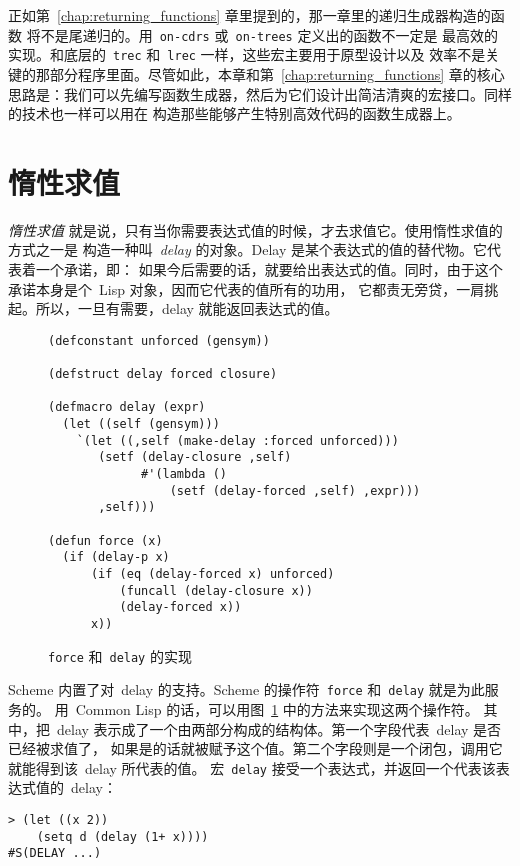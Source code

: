 正如第~\ref{chap:returning_functions} 章里提到的，那一章里的递归生成器构造的函数
将不是尾递归的。用~\texttt{on-cdrs} 或~\texttt{on-trees} 定义出的函数不一定是
最高效的实现。和底层的~\texttt{trec} 和~\texttt{lrec} 一样，这些宏主要用于原型设计以及
效率不是关键的那部分程序里面。尽管如此，本章和第~\ref{chap:returning_functions} 章的核心
思路是：我们可以先编写函数生成器，然后为它们设计出简洁清爽的宏接口。同样的技术也一样可以用在
构造那些能够产生特别高效代码的函数生成器上。

\section{惰性求值}
\label{sec:lazy_evaluation}

\emph{惰性求值} 就是说，只有当你需要表达式值的时候，才去求值它。使用惰性求值的方式之一是
构造一种叫~\emph{delay} 的对象。Delay 是某个表达式的值的替代物。它代表着一个承诺，即：
如果今后需要的话，就要给出表达式的值。同时，由于这个承诺本身是个~Lisp 对象，因而它代表的值所有的功用，
它都责无旁贷，一肩挑起。所以，一旦有需要，delay 就能返回表达式的值。

\begin{figure}
\begin{lstlisting}
(defconstant unforced (gensym))

(defstruct delay forced closure)

(defmacro delay (expr)
  (let ((self (gensym)))
    `(let ((,self (make-delay :forced unforced)))
       (setf (delay-closure ,self)
             #'(lambda ()
                 (setf (delay-forced ,self) ,expr)))
       ,self)))

(defun force (x)
  (if (delay-p x)
      (if (eq (delay-forced x) unforced)
          (funcall (delay-closure x))
          (delay-forced x))
      x))
\end{lstlisting}
  \caption{\texttt{force} 和~\texttt{delay} 的实现}
  \label{fig:implementation_of_force_and_delay}
\end{figure}

Scheme 内置了对~delay 的支持。Scheme 的操作符~\texttt{force} 和~\texttt{delay} 就是为此服务的。
用~Common Lisp 的话，可以用图~\ref{fig:implementation_of_force_and_delay} 中的方法来实现这两个操作符。
其中，把~delay 表示成了一个由两部分构成的结构体。第一个字段代表~delay 是否已经被求值了，
如果是的话就被赋予这个值。第二个字段则是一个闭包，调用它就能得到该~delay 所代表的值。
宏~\texttt{delay} 接受一个表达式，并返回一个代表该表达式值的~delay：
\begin{lstlisting}
> (let ((x 2))
    (setq d (delay (1+ x))))
#S(DELAY ...)
\end{lstlisting}

